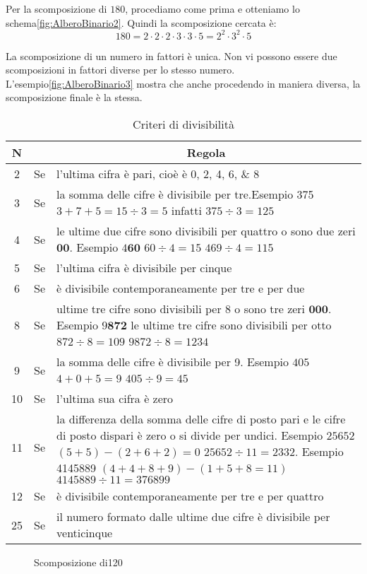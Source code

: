 Per la scomposizione di $180$, procediamo come prima e otteniamo lo schema\nobs\vref{fig:AlberoBinario2}. Quindi la scomposizione cercata è:
\[180=2\cdot 2\cdot 2\cdot 3\cdot 3\cdot 5=2^2\cdot 3^2\cdot 5 \]    

La scomposizione di un numero in fattori è unica. Non vi possono essere due scomposizioni in fattori diverse per lo stesso numero. L'esempio\nobs\vref{fig:AlberoBinario3} mostra che anche procedendo in maniera diversa, la scomposizione finale è la stessa.
\begin{table}
\centering
\begin{tabular}{ccp{}}
\toprule  N&  &\multicolumn{1}{c}{Regola}   \\ 
\midrule 2 & Se & l'ultima cifra è pari, cioè è  \numlist{0;2;4;6;8} \\ 
3 & Se & la somma delle cifre è divisibile per tre.Esempio \num{375} $3+7+5=15\div3=5$ infatti $375\div 3=125$ \\ 
 4 & Se & le ultime due cifre sono divisibili per quattro o sono due zeri $\mathbf{00}$. Esempio $4\mathbf{60}$ $60\div 4=15$ $469\div 4=115$ \\
 5 & Se & l'ultima cifra è divisibile per cinque \\  
 6 & Se & è divisibile contemporaneamente per tre e per due  \\  
 8 & Se & ultime tre cifre sono divisibili per 8 o sono tre zeri $\mathbf{000}$. Esempio $9\mathbf{872}$ le ultime tre cifre sono divisibili per otto $872\div 8= 109$ $9872\div 8=1234$ \\  
 9 & Se & la somma delle cifre è divisibile per 9. Esempio $405$ $4+0+5=9$ $405\div9=45$  \\
 10 & Se & l'ultima sua cifra è zero \\
 11 & Se& la differenza della somma delle cifre di posto pari e le cifre di posto dispari è zero o si divide per undici. Esempio $25652$ $(5+5)-(2+6+2)=0$ $25652\div 11=2332$. Esempio \num{4145889} $(4+4+8+9)-(1+5+8=11)$ $4145889\div 11=376899$  \\    
 12 & Se & è divisibile contemporaneamente per tre e per quattro  \\  
 25 & Se & il numero  formato dalle ultime due cifre è divisibile per venticinque\\
\bottomrule
\end{tabular}
\caption{Criteri di divisibilità}
\label{tab:criteriDivisitilita}
\end{table} 
\begin{figure}
		\centering

	\caption[]{Scomposizione di\num{120}}
	\label{fig:AlberoBinario1}
\end{figure}
